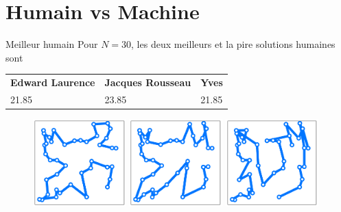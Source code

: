 \documentclass{beamer}
\begin{document}
\section{Humain vs Machine}
\begin{frame}{Meilleur humain}
  Pour $N=30$, les deux meilleurs et la pire solutions humaines sont
  \begin{table}
  \centering
  \begin{tabular}{C{3cm}C{3cm}C{3cm}}
\textbf{Edward Laurence} & \textbf{Jacques Rousseau} &\textbf{Yves}\\
21.85&23.85&21.85\\
  \end{tabular}
\end{table}
\vspace{-1cm}
  \begin{figure}[h!]
    \centering
      \includegraphics[width=0.32\textwidth]{figures/airdrop_player_1.pdf}
      \includegraphics[width=0.32\textwidth]{figures/airdrop_player_2.pdf}
      \includegraphics[width=0.32\textwidth]{figures/airdrop_player_3.pdf}
  \end{figure}
\end{frame}
\end{document}
